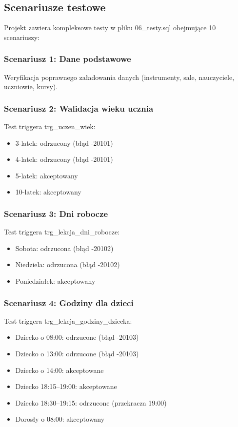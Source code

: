 \documentclass[12pt,a4paper]{article}
\begin{document}
\subsection{Scenariusze testowe}

Projekt zawiera kompleksowe testy w pliku 06\_testy.sql obejmujące 10 scenariuszy:

\subsubsection{Scenariusz 1: Dane podstawowe}
Weryfikacja poprawnego załadowania danych (instrumenty, sale, nauczyciele, uczniowie, kursy).

\subsubsection{Scenariusz 2: Walidacja wieku ucznia}
Test triggera trg\_uczen\_wiek:
\begin{itemize}[nosep]
    \item 3-latek: odrzucony (błąd -20101)
    \item 4-latek: odrzucony (błąd -20101)
    \item 5-latek: akceptowany
    \item 10-latek: akceptowany
\end{itemize}

\subsubsection{Scenariusz 3: Dni robocze}
Test triggera trg\_lekcja\_dni\_robocze:
\begin{itemize}[nosep]
    \item Sobota: odrzucona (błąd -20102)
    \item Niedziela: odrzucona (błąd -20102)
    \item Poniedziałek: akceptowany
\end{itemize}

\subsubsection{Scenariusz 4: Godziny dla dzieci}
Test triggera trg\_lekcja\_godziny\_dziecka:
\begin{itemize}[nosep]
    \item Dziecko o 08:00: odrzucone (błąd -20103)
    \item Dziecko o 13:00: odrzucone (błąd -20103)
    \item Dziecko o 14:00: akceptowane
    \item Dziecko 18:15--19:00: akceptowane
    \item Dziecko 18:30--19:15: odrzucone (przekracza 19:00)
    \item Dorosły o 08:00: akceptowany
\end{itemize}
\end{document}
